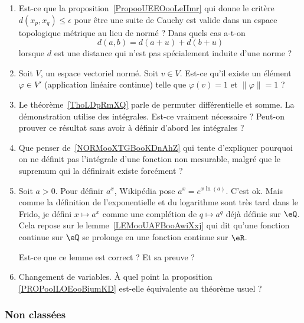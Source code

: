 \begin{enumerate}
    \item
        Est-ce que la proposition~\ref{PropooUEEOooLeIImr} qui donne le critère \( d(x_p,x_q)\leq \epsilon\) pour être une suite de Cauchy est valide dans un espace topologique métrique au lieu de normé ?  Dans quels cas a-t-on
        \begin{equation}
            d(a,b)=d(a+u)+d(b+u)
        \end{equation}
        lorsque \( d\) est une distance qui n'est pas spécialement induite d'une norme ?

    \item
        Soit \( V\), un espace vectoriel normé. Soit \( v\in V\). Est-ce qu'il existe un élément \( \varphi\in V'\) (application linéaire continue) telle que \( \varphi(v)=1\) et \( \| \varphi \|=1\) ?
    \item
        Le théorème~\ref{ThoLDpRmXQ} parle de permuter différentielle et somme. La démonstration utilise des intégrales. Est-ce vraiment nécessaire ? Peut-on prouver ce résultat sans avoir à définir d'abord les intégrales ?
    \item
        Que penser de~\ref{NORMooXTGBooKDnAhZ} qui tente d'expliquer pourquoi on ne définit pas l'intégrale d'une fonction non mesurable, malgré que le supremum qui la définirait existe forcément ?
    \item
        Soit \( a>0\). Pour définir \( a^x\), Wikipédia pose \( a^x=e^{x\ln(a)}\). C'est ok. Mais comme la définition de l'exponentielle et du logarithme sont très tard dans le Frido, je défini \(x\mapsto a^x\) comme une complétion de \( q\mapsto a^q\) déjà définie sur \( \eQ\). Cela repose sur le lemme~\ref{LEMooUAFBooAwiXxj} qui dit qu'une fonction continue sur \( \eQ\) se prolonge en une fonction continue sur \( \eR\).

        Est-ce que ce lemme est correct ? Et sa preuve ?
    \item
        Changement de variables. À quel point la proposition \ref{PROPooILOEooBiumKD} est-elle équivalente au théorème usuel ?
\end{enumerate}

\subsubsection{Non classées}


